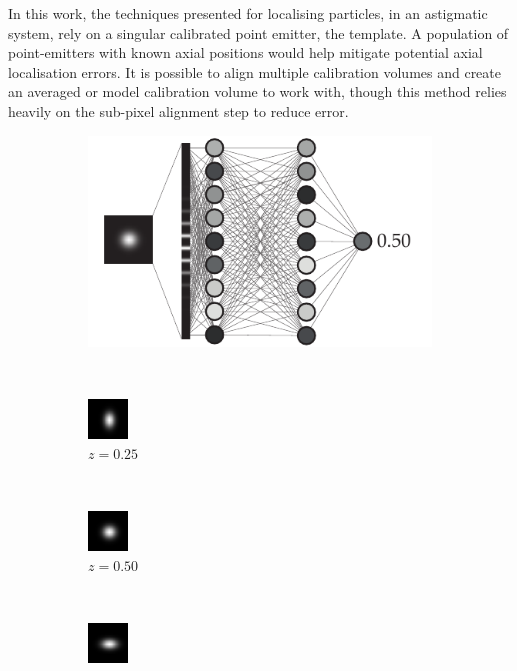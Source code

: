 In this work, the techniques presented for localising particles, in an astigmatic system, rely on a singular calibrated point emitter, the template.
A population of point-emitters with known axial positions would help mitigate potential axial localisation errors.
It is possible to align multiple calibration volumes and create an averaged or model calibration volume to work with, though this method relies heavily on the sub-pixel alignment step to reduce error.

\begin{figure}
    \centering
    \begin{subfigure}[t]{\linewidth}
        \centering
        \includegraphics{nn_astig_scheme_sub}
        \caption{}
    \end{subfigure}\\\vspace{\abovecaptionskip}
    \begin{subfigure}[t]{0.2\linewidth}
        \centering
        \includegraphics[width=1.06cm]{nn/4}
        \caption{\(z=0.25\)}
    \end{subfigure}~
    \begin{subfigure}[t]{0.2\linewidth}
        \centering
        \includegraphics[width=1.06cm]{nn/8}
        \caption{\(z=0.50\)}
    \end{subfigure}~
    \begin{subfigure}[t]{0.2\linewidth}
        \centering
        \includegraphics[width=1.06cm]{nn/12}

\end{subfigure}
\end{figure}
